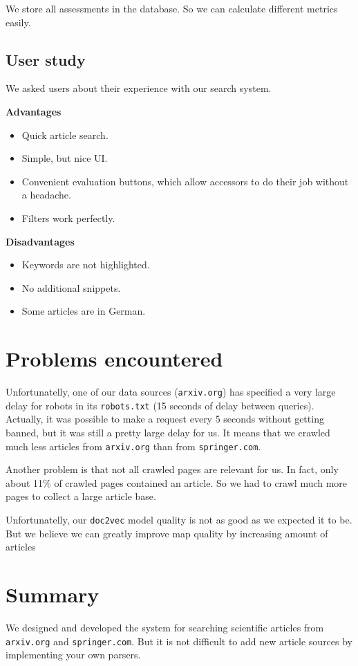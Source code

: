 We store all assessments in the database. So we can calculate different metrics easily.

\subsection{User study}
We asked users about their experience with our search system.

\textbf{Advantages}
\begin{itemize}
	\item Quick article search.
	\item Simple, but nice UI.
	\item Convenient evaluation buttons, which allow accessors to do their job without a headache.
	\item Filters work perfectly.
\end{itemize}

\textbf{Disadvantages}
\begin{itemize}
	\item Keywords are not highlighted.
	\item No additional snippets.
	\item Some articles are in German.
\end{itemize}	
 
\section{Problems encountered}
Unfortunatelly, one of our data sources (\texttt{arxiv.org}) has specified a very large delay for robots in its \texttt{robots.txt} (15 seconds of delay between queries).
Actually, it was possible to make a request every 5 seconds without getting banned, but it was still a pretty large delay for us. 
It means that we crawled much less articles from \texttt{arxiv.org} than from \texttt{springer.com}.

Another problem is that not all crawled pages are relevant for us. In fact, only about 11\% of crawled pages contained an article. 
So we had to crawl much more pages to collect a large article base.

Unfortunatelly, our \texttt{doc2vec} model quality is not as good as we expected it to be. 
But we believe we can greatly improve map quality by increasing amount of articles
\section{Summary}
We designed and developed the system for searching scientific articles from \texttt{arxiv.org} and \texttt{springer.com}. But it is not difficult to add new article sources by implementing your own parsers.

